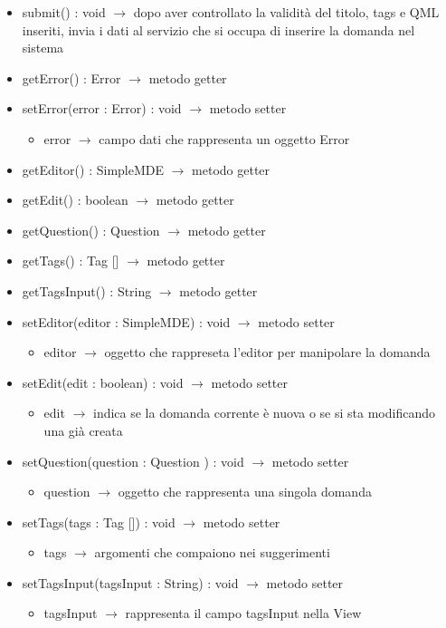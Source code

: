 \begin{description}
\begin{itemize}
	\item submit() : void $\rightarrow$ dopo aver controllato la validità del titolo, tags e QML inseriti, invia i dati al servizio che si occupa di inserire la domanda nel sistema
	\item getError() : Error $\rightarrow$ metodo getter
	\item setError(error : Error) : void $\rightarrow$ metodo setter\begin{itemize}
		\item error $\rightarrow$ campo dati che rappresenta un oggetto Error
	\end{itemize}
	
	\item getEditor() : SimpleMDE $\rightarrow$ metodo getter
	\item getEdit() : boolean $\rightarrow$ metodo getter
	\item getQuestion() : Question  $\rightarrow$ metodo getter
	\item getTags() : Tag [] $\rightarrow$ metodo getter
	\item getTagsInput() : String $\rightarrow$ metodo getter
	\item setEditor(editor : SimpleMDE) : void $\rightarrow$ metodo setter\begin{itemize}
		\item editor $\rightarrow$ oggetto che rappreseta l'editor per manipolare la domanda
	\end{itemize}
	
	\item setEdit(edit : boolean) : void $\rightarrow$ metodo setter\begin{itemize}
		\item edit $\rightarrow$ indica se la domanda corrente è nuova o se si sta modificando una già creata
	\end{itemize}
	
	\item setQuestion(question : Question ) : void $\rightarrow$ metodo setter\begin{itemize}
		\item question $\rightarrow$ oggetto che rappresenta una singola domanda
	\end{itemize}
	
	\item setTags(tags : Tag []) : void $\rightarrow$ metodo setter\begin{itemize}
		\item tags $\rightarrow$ argomenti che compaiono nei suggerimenti
	\end{itemize}
	
	\item setTagsInput(tagsInput : String) : void $\rightarrow$ metodo setter\begin{itemize}
		\item tagsInput $\rightarrow$ rappresenta il campo tagsInput nella View
	\end{itemize}
	
\end{itemize}

\end{description}


